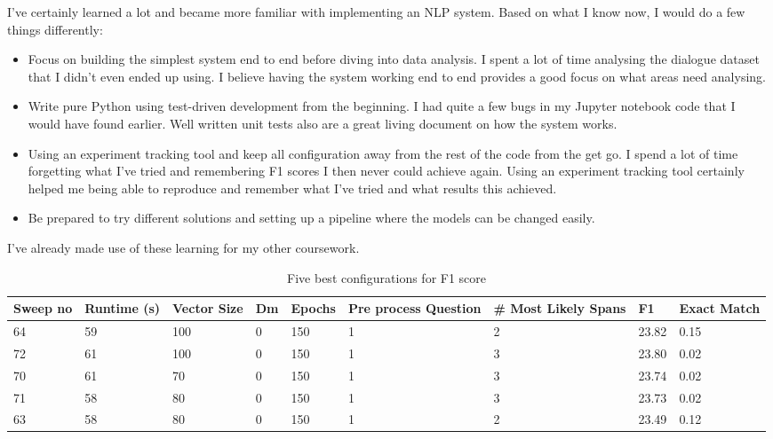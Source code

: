 \documentclass[11pt]{article}
\begin{document}
    I've certainly learned a lot and became more familiar with implementing an NLP system. Based on what
    I know now, I would do a few things differently:
    \begin{itemize}
        \item Focus on building the simplest system end to end before diving into data analysis. I spent a lot of
        time analysing the dialogue dataset that I didn't even ended up using. I believe having the system working end to
        end provides a good focus on what areas need analysing.
        \item Write pure Python using test-driven development from the beginning. I had quite a few bugs in my
        Jupyter notebook code that I would have found earlier. Well written unit tests also are a great living
        document on how the system works.
        \item Using an experiment tracking tool and keep all configuration away from the rest of the code from the get go.
        I spend a lot of time forgetting what I've tried and remembering F1 scores I then never could achieve again. Using
        an experiment tracking tool certainly helped me being able to reproduce and remember what I've tried and what results
        this achieved.
        \item Be prepared to try different solutions and setting up a pipeline where the models can be changed easily.
    \end{itemize}

    I've already made use of these learning for my other coursework.

    
    

    \begin{table}[p]
        \centering
        \begin{tabularx}{\textwidth}{|X|X|X|X|X|X|X|X|X|}
            \hline
            Sweep no & Runtime (s) & Vector Size & Dm & Epochs & Pre process Question & \# Most Likely Spans & F1 & Exact Match \\ \hline
            64       & 59          & 100         & 0  & 150    & 1                    & 2                    & 23.82 & 0.15        \\ \hline
            72       & 61          & 100         & 0  & 150    & 1                    & 3                    & 23.80 & 0.02        \\ \hline
            70       & 61          & 70          & 0  & 150    & 1                    & 3                    & 23.74 & 0.02        \\ \hline
            71       & 58          & 80          & 0  & 150    & 1                    & 3                    & 23.73 & 0.02        \\ \hline
            63       & 58          & 80          & 0  & 150    & 1                    & 2                    & 23.49 & 0.12        \\ \hline
        \end{tabularx}
        \caption{Five best configurations for F1 score}
        \label{table:5-best-f1}
    \end{table}
\end{document}

